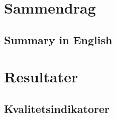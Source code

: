 \documentclass{article}
\begin{document}
    
    
    \section{Sammendrag}
    
    \subsection{Summary in English}
    
    \newpage
    
    
    
    \section{Resultater}
    
    \subsection{Kvalitetsindikatorer}
    
\end{document}
